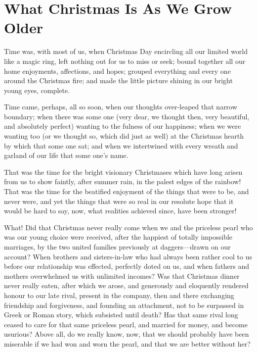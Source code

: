 \chapter{What Christmas Is As We Grow Older}



Time was, with most of us, when Christmas Day encircling all our
limited world like a magic ring, left nothing out for us to miss or
seek; bound together all our home enjoyments, affections, and hopes;
grouped everything and every one around the Christmas fire; and made
the little picture shining in our bright young eyes, complete.

Time came, perhaps, all so soon, when our thoughts over-leaped that
narrow boundary; when there was some one (very dear, we thought
then, very beautiful, and absolutely perfect) wanting to the fulness
of our happiness; when we were wanting too (or we thought so, which
did just as well) at the Christmas hearth by which that some one
sat; and when we intertwined with every wreath and garland of our
life that some one's name.

That was the time for the bright visionary Christmases which have
long arisen from us to show faintly, after summer rain, in the
palest edges of the rainbow!  That was the time for the beatified
enjoyment of the things that were to be, and never were, and yet the
things that were so real in our resolute hope that it would be hard
to say, now, what realities achieved since, have been stronger!

What!  Did that Christmas never really come when we and the
priceless pearl who was our young choice were received, after the
happiest of totally impossible marriages, by the two united families
previously at daggers---drawn on our account?  When brothers and
sisters-in-law who had always been rather cool to us before our
relationship was effected, perfectly doted on us, and when fathers
and mothers overwhelmed us with unlimited incomes?  Was that
Christmas dinner never really eaten, after which we arose, and
generously and eloquently rendered honour to our late rival, present
in the company, then and there exchanging friendship and
forgiveness, and founding an attachment, not to be surpassed in
Greek or Roman story, which subsisted until death?  Has that same
rival long ceased to care for that same priceless pearl, and married
for money, and become usurious?  Above all, do we really know, now,
that we should probably have been miserable if we had won and worn
the pearl, and that we are better without her?

